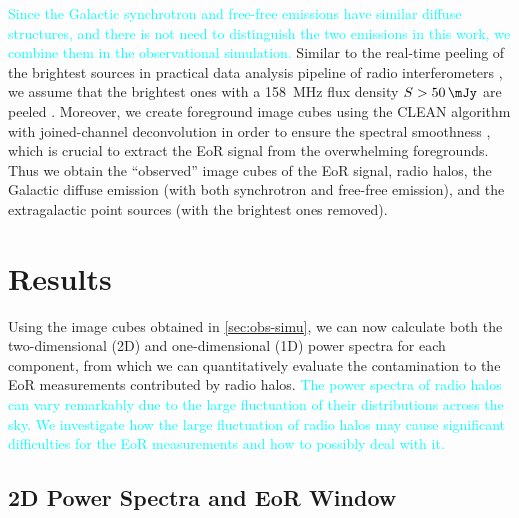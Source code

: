\documentclass[modern]{aastex62}
\begin{document}
\textcolor{cyan}{%
Since the Galactic synchrotron and free-free emissions have similar
diffuse structures, and there is not need to distinguish the two
emissions in this work, we combine them in the observational simulation.}
Similar to the real-time peeling of the brightest sources in practical
data analysis pipeline of radio interferometers
\citep[e.g.,][]{mitchell2008,intema2009}, we assume that the brightest
ones with a \SI{158}{\MHz} flux density $S > \SI{50}{\mJy}$
are peeled \citep[e.g.,][]{pindor2011}.
Moreover, we create foreground image cubes using the CLEAN algorithm
with joined-channel deconvolution in order to ensure the spectral
smoothness \citep{offringa2017}, which is crucial to extract the EoR
signal from the overwhelming foregrounds.
Thus we obtain the \enquote{observed} image cubes of the EoR signal,
radio halos, the Galactic diffuse emission (with both synchrotron and
free-free emission), and the extragalactic point sources (with the
brightest ones removed).


\section{Results}
\label{sec:results}

Using the image cubes obtained in \autoref{sec:obs-simu}, we can now
calculate both the two-dimensional (2D) and one-dimensional (1D) power
spectra for each component, from which we can quantitatively evaluate the
contamination to the EoR measurements contributed by radio halos.
\textcolor{cyan}{%
The power spectra of radio halos can vary remarkably due to the large
fluctuation of their distributions across the sky.
We investigate how the large fluctuation of radio halos may cause
significant difficulties for the EoR measurements and how to possibly
deal with it.}

\subsection{2D Power Spectra and EoR Window}
\label{sec:ps2d}
\end{document}
